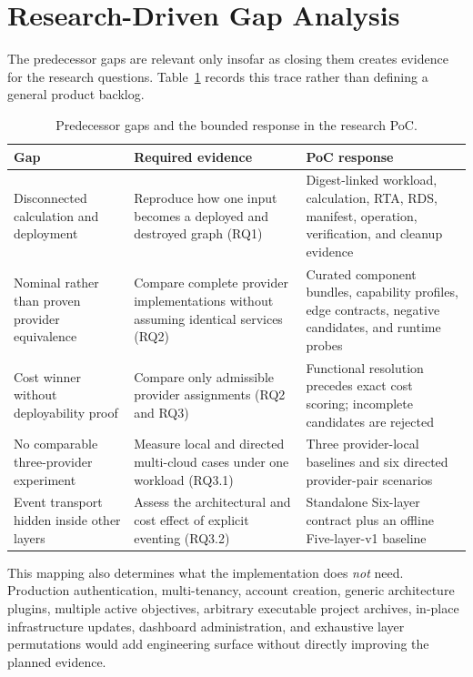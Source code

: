 \section{Research-Driven Gap Analysis}
\label{sec:legacy-gap-analysis}

The predecessor gaps are relevant only insofar as closing them creates evidence
for the research questions. Table~\ref{tab:gap-rq-map} records this trace rather
than defining a general product backlog.

\begin{table}[htbp]
\centering
\caption{Predecessor gaps and the bounded response in the research PoC.}
\label{tab:gap-rq-map}
\begin{tabular}{p{3.2cm}p{4.7cm}p{4.7cm}}
\hline
\textbf{Gap} & \textbf{Required evidence} & \textbf{PoC response} \\
\hline
Disconnected calculation and deployment & Reproduce how one input becomes a
deployed and destroyed graph (RQ1) & Digest-linked workload, calculation, RTA,
RDS, manifest, operation, verification, and cleanup evidence \\

Nominal rather than proven provider equivalence & Compare complete provider
implementations without assuming identical services (RQ2) & Curated component
bundles, capability profiles, edge contracts, negative candidates, and runtime
probes \\

Cost winner without deployability proof & Compare only admissible provider
assignments (RQ2 and RQ3) & Functional resolution precedes exact cost scoring;
incomplete candidates are rejected \\

No comparable three-provider experiment & Measure local and directed
multi-cloud cases under one workload (RQ3.1) & Three provider-local baselines
and six directed provider-pair scenarios \\

Event transport hidden inside other layers & Assess the architectural and cost
effect of explicit eventing (RQ3.2) & Standalone Six-layer contract plus an
offline Five-layer-v1 baseline \\
\hline
\end{tabular}
\end{table}

This mapping also determines what the implementation does \emph{not} need.
Production authentication, multi-tenancy, account creation, generic architecture
plugins, multiple active objectives, arbitrary executable project archives,
in-place infrastructure updates, dashboard administration, and exhaustive layer
permutations would add engineering surface without directly improving the
planned evidence.

